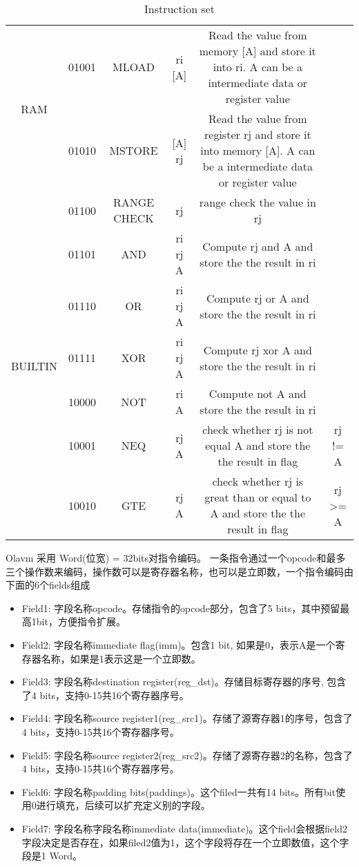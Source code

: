 \begin{table}[!ht]
{\begin{tabular}{|c|c|c|c|c|c|}
            \multirow{2}{*}{RAM} & 01001 & MLOAD & ri [A] & Read the value from memory [A] and store it into ri. A can be a intermediate data or register value &  \\ \cline{2-6}
            & 01010 & MSTORE & [A] rj & Read the value from register rj and store it into memory [A]. A can be a intermediate data or register value &  \\ \hline
            \multirow{8}{*}{BUILTIN} & 01100 & RANGE CHECK & rj & range check the value in rj  &  \\ \cline{2-6}
            & 01101 & AND & ri rj A &  Compute rj and A and store the the result in ri &  \\ \cline{2-6}
            & 01110 & OR & ri rj A &  Compute rj or A and store the the result in ri &  \\ \cline{2-6}
            & 01111 & XOR & ri rj A &  Compute rj xor A and store the the result in ri &  \\ \cline{2-6}
            & 10000 & NOT & ri A &  Compute not A and store the the result in ri &  \\ \cline{2-6}
            & 10001 & NEQ & rj A &  check whether rj is not equal A and store the the result in flag & rj != A \\ \cline{2-6}
            & 10010 & GTE & rj A &  check whether rj is great than or equal to A and store the the result in flag &  rj >= A \\ \hline
        \end{tabular}%
    }
    \caption{Instruction set}
    \label{table:instruction-set}
\end{table}

Olavm 采用 Word(位宽) = 32bits对指令编码。
一条指令通过一个opcode和最多三个操作数来编码，操作数可以是寄存器名称，也可以是立即数，一个指令编码由下面的6个fields组成
\begin{itemize}
    \item Field1: 字段名称opcode。存储指令的opcode部分，包含了5 bits，其中预留最高1bit，方便指令扩展。
    \item Field2: 字段名称immediate flag(imm)。包含1 bit, 如果是0，表示A是一个寄存器名称，如果是1表示这是一个立即数。
    \item Field3: 字段名称destination register(reg\_dst)。存储目标寄存器的序号, 包含了4 bits，支持0-15共16个寄存器序号。
    \item Field4: 字段名称source register1(reg\_src1)。存储了源寄存器1的序号，包含了4 bits，支持0-15共16个寄存器序号。
    \item Field5: 字段名称source register2(reg\_src2)。存储了源寄存器2的名称，包含了4 bits，支持0-15共16个寄存器序号。
    \item Field6: 字段名称padding bits(paddings)。这个filed一共有14 bits。所有bit使用0进行填充，后续可以扩充定义别的字段。
    \item Field7: 字段名称字段名称immediate data(immediate)。这个field会根据field2字段决定是否存在，如果filed2值为1，这个字段将存在一个立即数值，这个字段是1 Word。
\end{itemize}


